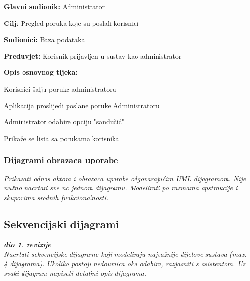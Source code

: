			\noindent {}
		\begin{packed_item}
			
			\item \textbf{Glavni sudionik: }$ $Administrator$ $
			\item  \textbf{Cilj:} $ $Pregled poruka koje su poslali korisnici $ $
			\item  \textbf{Sudionici:} $ $Baza podataka$ $
			\item  \textbf{Preduvjet:} $ $Korisnik prijavljen u sustav kao administrator $ $
			\item  \textbf{Opis osnovnog tijeka:}
			
			\item[] \begin{packed_enum}
				
				\item $ $Korisnici šalju poruke administratoru$ $
				\item $ $Aplikacija proslijedi poslane poruke Administratoru$ $
				\item $ $Administrator odabire opciju "sandučić"$ $
				\item $ $Prikaže se lista sa porukama korisnika$ $
			\end{packed_enum}
		\end{packed_item}
	
		
		
			
			
				\subsubsection{Dijagrami obrazaca uporabe}
					
					\textit{Prikazati odnos aktora i obrazaca uporabe odgovarajućim UML dijagramom. Nije nužno nacrtati sve na jednom dijagramu. Modelirati po razinama apstrakcije i skupovima srodnih funkcionalnosti.}
				\eject		
				
			\subsection{Sekvencijski dijagrami}
				
				\textbf{\textit{dio 1. revizije}}\\
				
				\textit{Nacrtati sekvencijske dijagrame koji modeliraju najvažnije dijelove sustava (max. 4 dijagrama). Ukoliko postoji nedoumica oko odabira, razjasniti s asistentom. Uz svaki dijagram napisati detaljni opis dijagrama.}
				\eject
	

